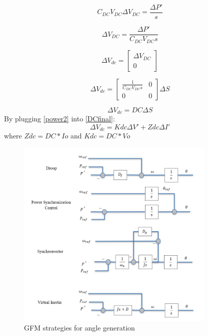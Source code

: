 \begin{equation}
 {C_{DC}V_{DC}\Delta V_{DC}} = \frac{\Delta P'}{s}
\end{equation}

\begin{equation}
 \Delta V_{DC} = \frac{\Delta P'}{C_{DC}V_{DC}s}
\end{equation}

\begin{equation}
 \Delta V_{dc} = \begin{bmatrix}\Delta V_{DC} \\ 0\end{bmatrix}
\end{equation}

\begin{equation}
 \Delta V_{dc} =\begin{bmatrix}\frac{1}{C_{DC}V_{DC}s} & 0 \\ 0 & 0\end{bmatrix} {\Delta S}
\end{equation}

\begin{equation}\label{DCfinal}
 \Delta V_{dc} =DC {\Delta S}
\end{equation}
By plugging \ref{power2} into \ref{DCfinal}:
\begin{equation}
 \Delta V_{dc} =Kdc \Delta V'+Zdc \Delta I'
\end{equation}
where $Zdc=DC*Io$ and $Kdc=DC*Vo$

\begin{figure}[ht]
    \centering
	\includegraphics[width=0.85\textwidth]{figures/strategies.jpg}
	\caption[GFM strategies for angle generation]{GFM strategies for angle generation}
	\label{strategies}
\end{figure}

